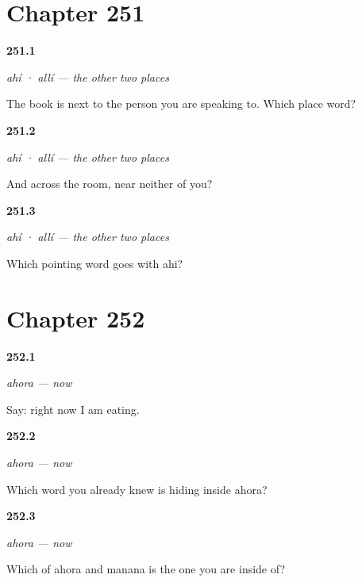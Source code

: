 \section*{Chapter 251}

\noindent\begin{minipage}[t]{\linewidth}
\raggedright
\hypertarget{review-ES-C65-ahi-alli-yours}{\textbf{251.1}} \emph{ahí · allí — the other two places}\par
\small The book is next to the person you are speaking to. Which place word?
\end{minipage}\par\medskip

\noindent\begin{minipage}[t]{\linewidth}
\raggedright
\hypertarget{review-ES-C65-ahi-alli-far}{\textbf{251.2}} \emph{ahí · allí — the other two places}\par
\small And across the room, near neither of you?
\end{minipage}\par\medskip

\noindent\begin{minipage}[t]{\linewidth}
\raggedright
\hypertarget{review-ES-C65-ahi-alli-pair}{\textbf{251.3}} \emph{ahí · allí — the other two places}\par
\small Which pointing word goes with ahi?
\end{minipage}\par\medskip

\section*{Chapter 252}

\noindent\begin{minipage}[t]{\linewidth}
\raggedright
\hypertarget{review-ES-C65-ahora-hoy-now}{\textbf{252.1}} \emph{ahora — now}\par
\small Say: right now I am eating.
\end{minipage}\par\medskip

\noindent\begin{minipage}[t]{\linewidth}
\raggedright
\hypertarget{review-ES-C65-ahora-hoy-inside}{\textbf{252.2}} \emph{ahora — now}\par
\small Which word you already knew is hiding inside ahora?
\end{minipage}\par\medskip

\noindent\begin{minipage}[t]{\linewidth}
\raggedright
\hypertarget{review-ES-C65-ahora-hoy-vs}{\textbf{252.3}} \emph{ahora — now}\par
\small Which of ahora and manana is the one you are inside of?
\end{minipage}\par\medskip

